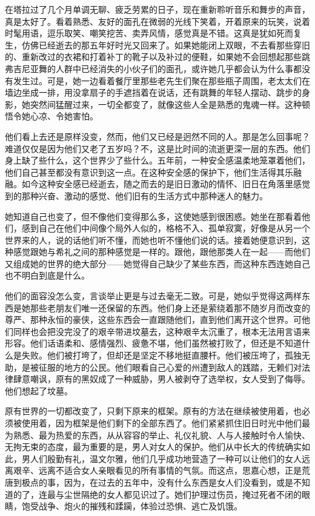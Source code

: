 \par 在塔拉过了几个月单调无聊、疲乏劳累的日子，现在重新聆听音乐和舞步的声音，真是太好了。看着熟悉、友好的面孔在微弱的光线下笑着，开着原来的玩笑，说着时髦用语，逗乐取笑、嘲笑挖苦、卖弄风情，感觉真是不错。这真是犹如死而复生，仿佛已经逝去的那五年好时光又回来了。如果她能闭上双眼，不去看那些穿旧的、重新改过的衣裙和打着补丁的靴子以及补过的便鞋，如果她不会回想起那些跳弗吉尼亚舞的人群中已经消失的小伙子们的面孔，或许她几乎都会认为什么事都没有发生过。可是，她一边看着餐厅里那些老先生们聚在那些瓶子周围，老太太们在墙边坐成一排，用没拿扇子的手遮挡着在说话，还有跳舞的年轻人摆动、跳步的身影，她突然间猛醒过来，一切全都变了，就像这些人全是熟悉的鬼魂一样。这种顿悟令她心凉、令她害怕。
\par 他们看上去还是原样没变，然而，他们又已经是迥然不同的人。那是怎么回事呢？难道仅仅是因为他们又老了五岁吗？不，这是比时间的流逝更深一层的东西。他们身上缺了些什么，这个世界少了些什么。五年前，一种安全感温柔地笼罩着他们，他们自己甚至都没有意识到这一点。在这种安全感的保护下，他们生活得其乐融融。如今这种安全感已经逝去，随之而去的是旧日激动的情怀、旧日在角落里感觉到的那种兴奋、激动的感觉、他们旧有的生活方式中那种迷人的魅力。
\par 她知道自己也变了，但不像他们变得那么多，这使她感到很困惑。她坐在那看着他们，感到自己在他们中间像个局外人似的，格格不入、孤单寂寞，好像是从另一个世界来的人，说的话他们听不懂，而她也听不懂他们说的话。接着她便意识到，这种感觉跟她与希礼之间的那种感觉是一样的。跟他，跟他那类人在一起——而他们又组成她的世界的绝大部分——她觉得自己缺少了某些东西，而这种东西连她自己也不明白到底是什么。
\par 他们的面容没怎么变，言谈举止更是与过去毫无二致。可是，她似乎觉得这两样东西是她那些老朋友们唯一还保留的东西。他们身上还是萦绕着那不随岁月而改变的尊严、那种永恒的豪侠，这些东西会一直跟随他们，直到他们离开这个世界。可他们同样也会把没完没了的艰辛带进坟墓去，这种艰辛太沉重了，根本无法用言语来形容。他们话语柔和、感情强烈、疲惫不堪，他们虽然被打败了，但还是不知道什么是失败。他们被打垮了，但却还是坚定不移地挺直腰杆。他们被压垮了，孤独无助，是被征服的地方的公民。他们眼看自己心爱的州遭到敌人的践踏，无赖们对法律肆意嘲讽，原有的黑奴成了一种威胁，男人被剥夺了选举权，女人受到了侮辱。他们想起了坟墓。
\par 原有世界的一切都改变了，只剩下原来的框架。原有的方法在继续被使用着，也必须被使用着，因为框架是他们剩下的全部东西了。他们紧紧抓住旧日时光中他们最为熟悉、最为热爱的东西，从从容容的举止、礼仪礼貌、人与人接触时令人愉快、无拘无束的态度，最为重要的是，男人对女人的保护。他们从中长大的传统确实如此，男人们殷勤有礼，温文尔雅，他们几乎成功地营造了一种可以让他们的女人远离艰辛、远离不适合女人亲眼看见的所有事情的气氛。而这点，思嘉心想，正是荒唐到极点的事，因为，在过去的五年中，没有什么东西是女人们没看到，或是不知道的了，连最与尘世隔绝的女人都见识过了。她们护理过伤员，掩过死者不闭的眼睛，饱受战争、炮火的摧残和蹂躏，体验过恐惧、逃亡及饥饿。
